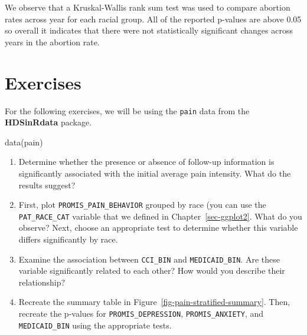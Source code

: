 \documentclass[
  letterpaper,
]{krantz}
\makeatletter
\newenvironment{Shaded}{\begin{snugshade}}{\end{snugshade}}
\newcommand{\FunctionTok}[1]{\textcolor[rgb]{0.28,0.35,0.67}{#1}}
\newcommand{\NormalTok}[1]{\textcolor[rgb]{0.00,0.23,0.31}{#1}}
\newenvironment{kframe}{%
\medskip{}
\setlength{\fboxsep}{.8em}
 \def\at@end@of@kframe{}%
 \ifinner\ifhmode%
  \def\at@end@of@kframe{\end{minipage}}%
  \begin{minipage}{\columnwidth}%
 \fi\fi%
 \def\FrameCommand##1{\hskip\@totalleftmargin \hskip-\fboxsep
 \colorbox{shadecolor}{##1}\hskip-\fboxsep
     \hskip-\linewidth \hskip-\@totalleftmargin \hskip\columnwidth}%
 \MakeFramed {\advance\hsize-\width
   \@totalleftmargin\z@ \linewidth\hsize
   \@setminipage}}%
 {\par\unskip\endMakeFramed%
 \at@end@of@kframe}
\renewenvironment{Shaded}{\begin{kframe}}{\end{kframe}}
\makeatother
\begin{document}
We observe that a Kruskal-Wallis rank sum test was used to compare
abortion rates across year for each racial group. All of the reported
p-values are above 0.05 so overall it indicates that there were not
statistically significant changes across years in the abortion rate.

\section{Exercises}\label{exercises-7}

For the following exercises, we will be using the \texttt{pain} data
from the \textbf{HDSinRdata} package.

\begin{Shaded}
\begin{Highlighting}[]
\FunctionTok{data}\NormalTok{(pain)}
\end{Highlighting}
\end{Shaded}

\begin{enumerate}
\def\labelenumi{\arabic{enumi}.}
\item
  Determine whether the presence or absence of follow-up information is
  significantly associated with the initial average pain intensity. What
  do the results suggest?
\item
  First, plot \texttt{PROMIS\_PAIN\_BEHAVIOR} grouped by race (you can
  use the \texttt{PAT\_RACE\_CAT} variable that we defined in
  Chapter~\ref{sec-ggplot2}. What do you observe? Next, choose an
  appropriate test to determine whether this variable differs
  significantly by race.
\item
  Examine the association between \texttt{CCI\_BIN} and
  \texttt{MEDICAID\_BIN}. Are these variable significantly related to
  each other? How would you describe their relationship?
\item
  Recreate the summary table in
  Figure~\ref{fig-pain-stratified-summary}. Then, recreate the p-values
  for \texttt{PROMIS\_DEPRESSION}, \texttt{PROMIS\_ANXIETY}, and
  \texttt{MEDICAID\_BIN} using the appropriate tests.
\end{enumerate}
\end{document}
